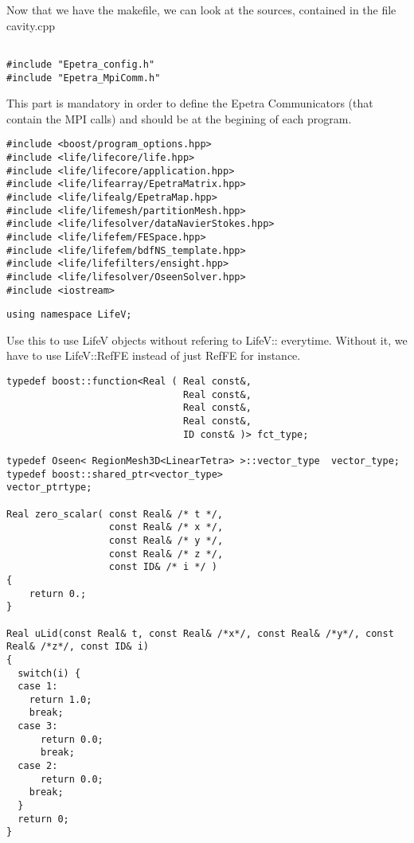 Now that we have the makefile, we can look at the sources, contained in the file cavity.cpp


\begin{verbatim}

#include "Epetra_config.h"
#include "Epetra_MpiComm.h"

\end{verbatim}

This part is mandatory in order to define the Epetra Communicators (that contain the MPI calls) 
 and should be
at the begining of each program.


\begin{verbatim}
#include <boost/program_options.hpp>
#include <life/lifecore/life.hpp>
#include <life/lifecore/application.hpp>
#include <life/lifearray/EpetraMatrix.hpp>
#include <life/lifealg/EpetraMap.hpp>
#include <life/lifemesh/partitionMesh.hpp>
#include <life/lifesolver/dataNavierStokes.hpp>
#include <life/lifefem/FESpace.hpp>
#include <life/lifefem/bdfNS_template.hpp>
#include <life/lifefilters/ensight.hpp>
#include <life/lifesolver/OseenSolver.hpp>
#include <iostream>
\end{verbatim}



\begin{verbatim}
using namespace LifeV;
\end{verbatim}

Use this to use LifeV objects  without refering to LifeV:: everytime.
Without it, we have to use LifeV::RefFE instead of just RefFE for instance.


\begin{verbatim}
typedef boost::function<Real ( Real const&,
                               Real const&,
                               Real const&,
                               Real const&,
                               ID const& )> fct_type;

typedef Oseen< RegionMesh3D<LinearTetra> >::vector_type  vector_type;
typedef boost::shared_ptr<vector_type>                   vector_ptrtype;

Real zero_scalar( const Real& /* t */,
                  const Real& /* x */,
                  const Real& /* y */,
                  const Real& /* z */,
                  const ID& /* i */ )
{
    return 0.;
}

Real uLid(const Real& t, const Real& /*x*/, const Real& /*y*/, const Real& /*z*/, const ID& i)
{
  switch(i) {
  case 1:
    return 1.0;
    break;
  case 3:
      return 0.0;
      break;
  case 2:
      return 0.0;
    break;
  }
  return 0;
}

\end{verbatim}

